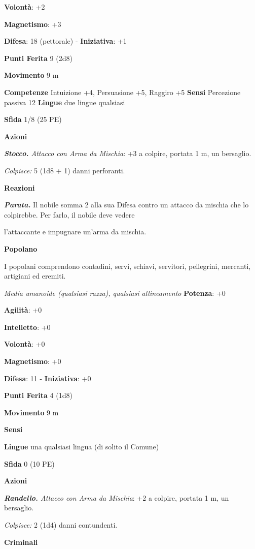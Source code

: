 \begin{multicols}{2}
\textbf{Volontà}: +2

\textbf{Magnetismo}: +3

\textbf{Difesa}: 18 (pettorale) - \textbf{Iniziativa}: +1

\textbf{Punti Ferita} 9 (2d8)

\textbf{Movimento} 9 m

\textbf{Competenze} Intuizione +4, Persuasione +5, Raggiro +5
\textbf{Sensi} Percezione passiva 12 \textbf{Lingue} due lingue
qualsiasi

\textbf{Sfida} 1/8 (25 PE)\smallskip

\smallskip\textbf{Azioni}

\emph{\textbf{Stocco.} Attacco con Arma da Mischia}: +3 a colpire,
portata 1 m, un bersaglio.

\emph{Colpisce:} 5 (1d8 + 1) danni perforanti.

\textbf{Reazioni}

\emph{\textbf{Parata.}} Il nobile somma 2 alla sua Difesa contro un attacco
da mischia che lo colpirebbe. Per farlo, il nobile deve vedere

l'attaccante e impugnare un'arma da mischia.

\textbf{Popolano}

I popolani comprendono contadini, servi, schiavi, servitori, pellegrini,
mercanti, artigiani ed eremiti.

\emph{Media umanoide (qualsiasi razza), qualsiasi allineamento}
\textbf{Potenza}: +0

\textbf{Agilità}: +0

\textbf{Intelletto}: +0

\textbf{Volontà}: +0

\textbf{Magnetismo}: +0

\textbf{Difesa}: 11 - \textbf{Iniziativa}: +0

\textbf{Punti Ferita} 4 (1d8)

\textbf{Movimento} 9 m

\textbf{Sensi} 

\textbf{Lingue} una qualsiasi lingua (di solito il Comune)

\textbf{Sfida} 0 (10 PE)\smallskip

\smallskip\textbf{Azioni}

\emph{\textbf{Randello.} Attacco con Arma da Mischia}: +2 a colpire,
portata 1 m, un bersaglio.

\emph{Colpisce:} 2 (1d4) danni contundenti.

\textbf{Criminali}


\end{multicols}
